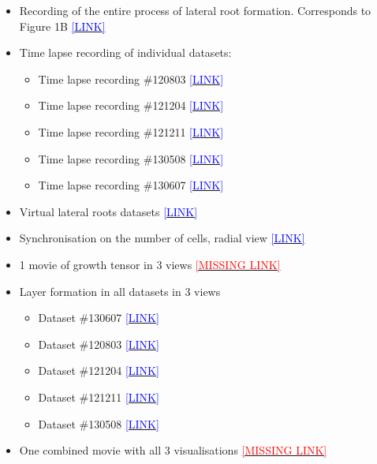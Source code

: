 \documentclass[11pt,a4paper, final]{article}
\begin{document}
\begin{itemize}
    \item Recording of the entire process of lateral root formation. Corresponds to Figure 1B \href{http://youtu.be/navcxqh7KCo}{\textcolor{blue}{[LINK]}}
    \item Time lapse recording of individual datasets:
    \begin{itemize}
    	\item Time lapse recording \#120803 \href{http://youtu.be/hvoDhoWLdSI}{\textcolor{blue}{[LINK]}}
        \item Time lapse recording \#121204 \href{http://youtu.be/bXf-gO8T0aQ}{\textcolor{blue}{[LINK]}}
        \item Time lapse recording \#121211 \href{http://youtu.be/ru7-g3KWV9E}{\textcolor{blue}{[LINK]}}
        \item Time lapse recording \#130508 \href{http://youtu.be/GApOwRMWmUU}{\textcolor{blue}{[LINK]}}
        \item Time lapse recording \#130607 \href{http://youtu.be/cFemfGbI5yA}{\textcolor{blue}{[LINK]}}
    \end{itemize}
    \item Virtual lateral roots datasets \href{http://youtu.be/EXIp3H0y5UI}{\textcolor{blue}{[LINK]}}
    \item Synchronisation on the number of cells, radial view \href{http://youtu.be/YZFkpcnyjiY}{\textcolor{blue}{[LINK]}}
    \item 1 movie of growth tensor in 3 views \href{http://youtu.be/cdY3t1iVRF8}{\textcolor{red}{[MISSING LINK]}}
    \item Layer formation in all datasets in 3 views
    \begin{itemize}
        \item Dataset \#130607 \href{http://youtu.be/cdY3t1iVRF8}{\textcolor{blue}{[LINK]}}
        \item Dataset \#120803 \href{http://youtu.be/yXki6QpltZo}{\textcolor{blue}{[LINK]}}
        \item Dataset \#121204 \href{http://youtu.be/Bd_UgUVyzrM}{\textcolor{blue}{[LINK]}}
        \item Dataset \#121211 \href{http://youtu.be/NOouEVqpGj8}{\textcolor{blue}{[LINK]}}
        \item Dataset \#130508 \href{http://youtu.be/EajarNlRvtA}{\textcolor{blue}{[LINK]}}
    \end{itemize}		
    \item One combined movie with all 3 visualisations \href{http://youtu.be/cdY3t1iVRF8}{\textcolor{red}{[MISSING LINK]}}

\end{itemize}
\end{document}

